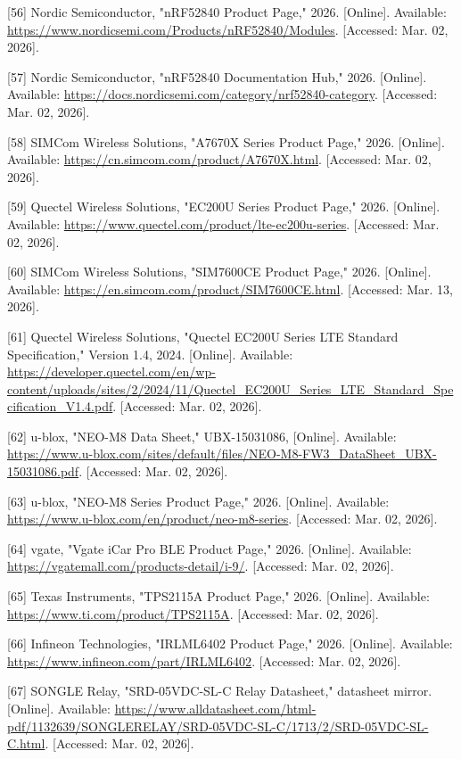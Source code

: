 \documentclass[a4paper]{extarticle}
\begin{document}
{[}56{]} Nordic Semiconductor, "nRF52840 Product Page," 2026.
{[}Online{]}. Available:
\url{https://www.nordicsemi.com/Products/nRF52840/Modules}. {[}Accessed:
Mar. 02, 2026{]}.

{[}57{]} Nordic Semiconductor, "nRF52840 Documentation Hub," 2026.
{[}Online{]}. Available:
\url{https://docs.nordicsemi.com/category/nrf52840-category}.
{[}Accessed: Mar. 02, 2026{]}.

{[}58{]} SIMCom Wireless Solutions, "A7670X Series Product Page," 2026.
{[}Online{]}. Available:
\url{https://cn.simcom.com/product/A7670X.html}. {[}Accessed: Mar. 02,
2026{]}.

{[}59{]} Quectel Wireless Solutions, "EC200U Series Product Page," 2026.
{[}Online{]}. Available:
\url{https://www.quectel.com/product/lte-ec200u-series}. {[}Accessed:
Mar. 02, 2026{]}.

{[}60{]} SIMCom Wireless Solutions, "SIM7600CE Product Page," 2026.
{[}Online{]}. Available:
\url{https://en.simcom.com/product/SIM7600CE.html}. {[}Accessed: Mar.
13, 2026{]}.

{[}61{]} Quectel Wireless Solutions, "Quectel EC200U Series LTE Standard
Specification," Version 1.4, 2024. {[}Online{]}. Available:
\url{https://developer.quectel.com/en/wp-content/uploads/sites/2/2024/11/Quectel_EC200U_Series_LTE_Standard_Specification_V1.4.pdf}.
{[}Accessed: Mar. 02, 2026{]}.

{[}62{]} u-blox, "NEO-M8 Data Sheet," UBX-15031086, {[}Online{]}.
Available:
\url{https://www.u-blox.com/sites/default/files/NEO-M8-FW3_DataSheet_UBX-15031086.pdf}.
{[}Accessed: Mar. 02, 2026{]}.

{[}63{]} u-blox, "NEO-M8 Series Product Page," 2026. {[}Online{]}.
Available: \url{https://www.u-blox.com/en/product/neo-m8-series}.
{[}Accessed: Mar. 02, 2026{]}.

{[}64{]} vgate, "Vgate iCar Pro BLE Product Page," 2026. {[}Online{]}.
Available: \url{https://vgatemall.com/products-detail/i-9/}.
{[}Accessed: Mar. 02, 2026{]}.

{[}65{]} Texas Instruments, "TPS2115A Product Page," 2026. {[}Online{]}.
Available: \url{https://www.ti.com/product/TPS2115A}. {[}Accessed: Mar.
02, 2026{]}.

{[}66{]} Infineon Technologies, "IRLML6402 Product Page," 2026.
{[}Online{]}. Available: \url{https://www.infineon.com/part/IRLML6402}.
{[}Accessed: Mar. 02, 2026{]}.

{[}67{]} SONGLE Relay, "SRD-05VDC-SL-C Relay Datasheet," datasheet
mirror. {[}Online{]}. Available:
\url{https://www.alldatasheet.com/html-pdf/1132639/SONGLERELAY/SRD-05VDC-SL-C/1713/2/SRD-05VDC-SL-C.html}.
{[}Accessed: Mar. 02, 2026{]}.
\end{document}
